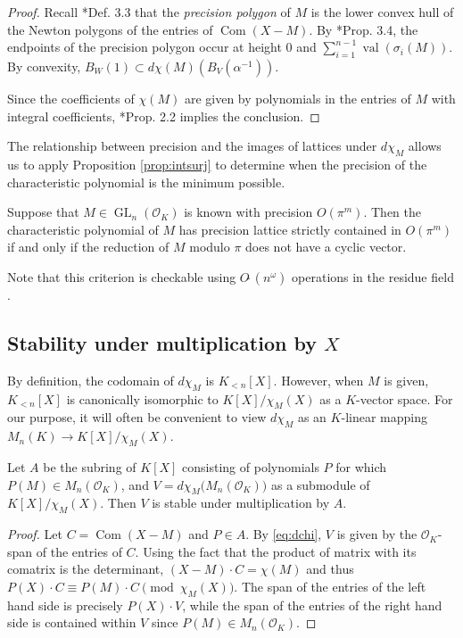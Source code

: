 \documentclass{sig-alternate-05-2015}
\DeclareMathOperator{\GL}{GL}
\DeclareMathOperator{\val}{val}
\DeclareMathOperator{\com}{Com}
\newcommand{\OK}{\mathcal{O}_K}
\newcommand{\softO}{O\tilde{~}}
\begin{document}
\begin{proof}

Recall \cite{caruso-roe-vaccon:15a}*{Def. 3.3} that the \emph{precision polygon}
of $M$ is the lower convex hull of the Newton polygons of the entries of $\com(X-M)$.
By \cite{caruso-roe-vaccon:15a}*{Prop. 3.4}, the endpoints of the precision polygon
occur at height $0$ and $\sum_{i=1}^{n-1} \val(\sigma_i(M))$.  By convexity,
$B_W(1) \subset d\chi(M)(B_V(\alpha^{-1}))$.

Since the coefficients of $\chi(M)$ are given by polynomials in the entries of $M$
with integral coefficients, \cite{caruso-roe-vaccon:15a}*{Prop. 2.2} implies
the conclusion.
\end{proof}

The relationship between precision and the images of lattices under $d\chi_M$ allows us to
apply Proposition \ref{prop:intsurj} to determine when the precision of the characteristic polynomial
is the minimum possible.

\begin{cor} \label{cor:prec_gain}
Suppose that $M \in \GL_n(\OK)$ is known with precision $O(\pi^m)$.
Then the characteristic polynomial of $M$ has precision lattice strictly contained in $O(\pi^m)$
if and only if the reduction of $M$ modulo $\pi$ does not have a cyclic vector.
\end{cor}

Note that this criterion is checkable using $\softO(n^\omega)$ operations in the residue field \cite{storjohann:01a}.

\subsection{Stability under multiplication by $X$}

By definition, the codomain of $d \chi_M$ is $K_{< n}[X]$. 
However, when $M$ is given, $K_{< n}[X]$ is canonically isomorphic
to $K[X]/\chi_M(X)$ as a $K$-vector space. For our purpose, it will 
often be convenient to view $d \chi_M$ as an $K$-linear mapping
$M_n(K) \to K[X]/\chi_M(X)$.

\begin{prop}
Let $A$ be the subring of $K[X]$ consisting of polynomials $P$ for
which $P(M) \in M_n(\OK)$, and $V = d \chi_M \big(M_n(\OK)\big)$
as a submodule of $K[X]/\chi_M(X)$.  Then $V$ is stable under 
multiplication by $A$.
\end{prop}
\begin{proof}
Let $C = \com(X-M)$ and $P \in A$.  By \eqref{eq:dchi}, $V$ is given by
the $\OK$-span of the entries of $C$.   Using the fact that the product of matrix
with its comatrix is the determinant, $(X - M) \cdot C = \chi(M)$ and thus
$P(X) \cdot C \equiv P(M) \cdot C \pmod{\chi_M(X)}$.  The span of the entries
of the left hand side is precisely $P(X) \cdot V$, while the span of the entries
of the right hand side is contained within $V$ since $P(M) \in M_n(\OK)$.
\end{proof}
\end{document}
